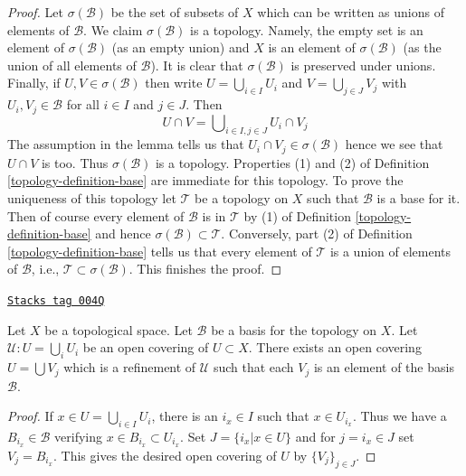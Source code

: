 \begin{proof}

Let $\sigma(\mathcal B)$ be the set of subsets of $X$ which can be written
as unions of elements of $\mathcal B$. We claim $\sigma(\mathcal{B})$
is a topology. Namely, the empty set is an element of $\sigma(\mathcal{B})$
(as an empty union) and $X$ is an element of $\sigma(\mathcal{B})$ (as the
union of all elements of $\mathcal{B}$). It is clear that $\sigma(\mathcal{B})$
is preserved under unions. Finally, if $U, V \in \sigma(\mathcal{B})$
then write $U = \bigcup_{i \in I} U_i$ and $V = \bigcup_{j \in J} V_j$
with $U_i, V_j \in \mathcal{B}$ for all $i \in I$ and $j \in J$.
Then
$$
U \cap V = \bigcup\nolimits_{i \in I, j \in J}
U_i \cap V_j
$$
The assumption in the lemma tells us that $U_i \cap V_j \in \sigma(\mathcal{B})$
hence we see that $U \cap V$ is too. Thus $\sigma(\mathcal{B})$ is a topology.
Properties (1) and (2) of Definition \ref{topology-definition-base} are
immediate for this topology. To prove the uniqueness of this topology
let $\mathcal T$ be a topology on $X$ such that $\mathcal B$ is a base for it.
Then of course every element of $\mathcal{B}$ is in $\mathcal{T}$ by
(1) of Definition \ref{topology-definition-base} and
hence $\sigma(\mathcal{B}) \subset \mathcal{T}$. Conversely, part
(2) of Definition \ref{topology-definition-base} tells us that every element
of $\mathcal{T}$ is a union of elements of $\mathcal{B}$, i.e.,
$\mathcal{T} \subset \sigma(\mathcal{B})$. This finishes the proof.
\end{proof}

\begin{lemma}
\label{topology-lemma-refine-covering-basis}
\href{https://stacks.math.columbia.edu/tag/004Q}{\texttt{Stacks tag 004Q}}

Let $X$ be a topological space.
Let $\mathcal{B}$ be a basis for the topology on $X$.
Let $\mathcal{U} : U = \bigcup_i U_i$ be an open covering of
$U \subset X$. There exists an open covering $U = \bigcup V_j$
which is a refinement of $\mathcal{U}$ such that each
$V_j$ is an element of the basis $\mathcal{B}$.
\end{lemma}

\begin{proof}
If $ x \in U = \bigcup_{i\in I} U_i $, there is an $ i_x \in I $ such that
$ x \in U_{i_x} $. Thus we have a $ B_{i_x} \in \mathcal{B}$
verifying $ x \in B_{i_x} \subset U_{i_x}$. Set
$J = \{i_x | x \in U\}$ and for $j = i_x \in J$ set $V_j = B_{i_x}$.
This gives the desired open covering of $U$ by $\{V_j\}_{j \in J}$.
\end{proof}

